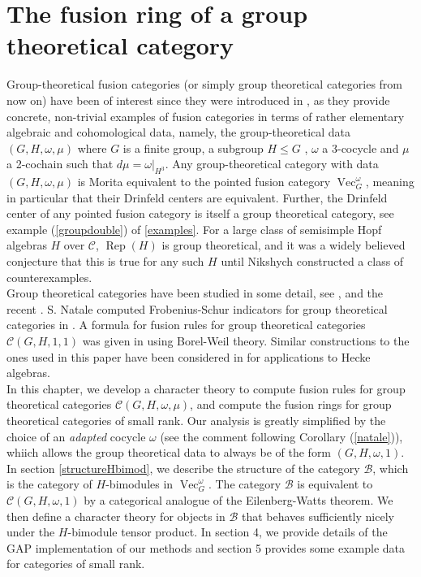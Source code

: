 \documentclass[11pt]{book}
\theoremstyle{Rem}
\theoremstyle{definition}
\numberwithin{equation}{section}
\newcommand\Rep{\operatorname{Rep}}
\newcommand\Vect{\operatorname{Vec}}
\newcommand\C{\mathcal C}
\newcommand\B{\mathcal B}
\begin{document}
\chapter{The fusion ring of a group theoretical category}
Group-theoretical fusion categories (or simply group theoretical categories from now on) have been of interest since they were introduced in \cite{Ost:MCDDFG}, as they provide concrete, non-trivial examples of fusion categories in terms of rather elementary algebraic and cohomological data, namely, the group-theoretical data $(G, H, \omega, \mu)$ where $G$ is a finite group, a subgroup $H\leq G$ , $\omega$ a 3-cocycle and $\mu$ a 2-cochain such that $d\mu = \omega|_{H^3}$. Any group-theoretical category with data $(G, H, \omega, \mu)$ is Morita equivalent to the pointed fusion category $\Vect_G^\omega$, meaning in particular that their Drinfeld centers are equivalent. Further, the Drinfeld center of any pointed fusion category is itself a group theoretical category, see example (\ref{groupdouble}) of \ref{examples}. For a large class of semisimple Hopf algebras $H$ over $\C$, $\Rep(H)$ is group theoretical, and it was a widely believed conjecture that this is true for any such $H$ until Nikshych \cite{MR2480712} constructed a class of counterexamples.\\
Group theoretical categories have been studied in some detail, see \cite{MR2710113}, \cite{MR2559854} and the recent \cite{morales2020algebraic}. S. Natale computed Frobenius-Schur indicators for group theoretical categories in \cite{Nat:FSICFC}. A formula for fusion rules for group theoretical categories $\C(G, H, 1, 1)$ was given in \cite{MR1444783} using Borel-Weil theory. Similar constructions to the ones used in this paper have been considered in \cite{Zhu:HARRHA} for applications to Hecke algebras.\\
In this chapter, we develop a character theory to compute fusion rules for group theoretical categories $\C(G, H, \omega, \mu)$, and compute the fusion rings for group theoretical categories of small rank. Our analysis is greatly simplified by the choice of an \textit{adapted} cocycle  $\omega$ (see the comment following Corollary (\ref{natale})), whiich allows the group theoretical data to always be of the form $(G, H, \omega, 1)$.  In section \ref{structureHbimod}, we describe the structure of the category $\B$, which is the category of $H$-bimodules in $\Vect^\omega_G$. The category $\B$ is equivalent to $\C(G, H, \omega, 1)$ by a categorical analogue of the Eilenberg-Watts theorem. We then define a character theory for objects in $\B$ that behaves sufficiently nicely under the $H$-bimodule tensor product.  In section 4, we provide details of the GAP implementation of our methods and section 5 provides some example data for categories of small rank.
\end{document}
